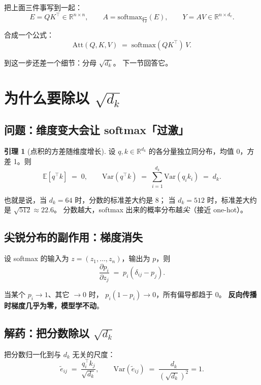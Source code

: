 \documentclass[11pt,a4paper]{ctexart}
\theoremstyle{definition}
\newtheorem{lemma}{引理}
\theoremstyle{remark}
\newcommand{\R}{\mathbb{R}}
\newcommand{\softmax}{\mathrm{softmax}}
\newcommand{\Att}{\mathrm{Att}}
\begin{document}
把上面三件事写到一起：
\[
  E = Q K^\top \in \R^{n\times n}, \qquad
  A = \softmax_{\text{行}}(E), \qquad
  Y = A V \in \R^{n \times d_v}.
\]

合成一个公式：
\begin{equation}
  \boxed{\;\Att(Q, K, V) \;=\; \softmax(QK^\top)\, V.\;}
\end{equation}

到这一步还差一个细节：分母 $\sqrt{d_k}$。
下一节回答它。

\section{为什么要除以 $\sqrt{d_k}$}

\subsection{问题：维度变大会让 softmax「过激」}

\begin{lemma}[点积的方差随维度增长]
设 $q, k \in \R^{d_k}$ 的各分量独立同分布，均值 0，方差 1。则
\[
  \mathbb{E}[q^\top k] \;=\; 0,\qquad \mathrm{Var}(q^\top k) \;=\; \sum_{i=1}^{d_k} \mathrm{Var}(q_i k_i) \;=\; d_k.
\]
\end{lemma}

也就是说，当 $d_k = 64$ 时，分数的标准差大约是 $8$；
当 $d_k = 512$ 时，标准差大约是 $\sqrt{512} \approx 22.6$。
分数越大，softmax 出来的概率分布越\emph{尖}（接近 one-hot）。

\subsection{尖锐分布的副作用：梯度消失}

设 softmax 的输入为 $z = (z_1, \dots, z_n)$，输出为 $p$，则
\[
  \frac{\partial p_i}{\partial z_j} \;=\; p_i (\delta_{ij} - p_j).
\]

当某个 $p_i \to 1$、其它 $\to 0$ 时，
$p_i(1 - p_i) \to 0$，所有偏导都趋于 0。
\textbf{反向传播时梯度几乎为零，模型学不动}。

\subsection{解药：把分数除以 $\sqrt{d_k}$}

把分数归一化到与 $d_k$ 无关的尺度：
\[
  \tilde{e}_{ij} \;=\; \frac{q_i^\top k_j}{\sqrt{d_k}}, \qquad
  \mathrm{Var}(\tilde e_{ij}) \;=\; \frac{d_k}{(\sqrt{d_k})^2} = 1.
\]
\end{document}
